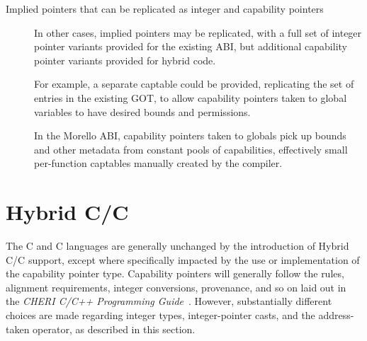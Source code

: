 \documentclass[12pt,twoside,openright,a4paper]{article}
\newcommand{\futurevariant}[1]{{\color{purple} #1}}
\newcommand{\morellovariant}[1]{{\color{red} #1}}
\newcommand{\note}[2]{{\color{blue}[ Note: #1 - #2]}}
\renewcommand{\note}[2]{\relax\ifhmode\unskip\fi}
\newcommand{\rwnote}[1]{\note{#1}{Robert W.}}
\newcommand{\psnote}[1]{\note{#1}{Peter S.}}
\newcommand*{\cpp}{\texorpdfstring{C\textsmaller[2]{\protect\nolinebreak[4]\hspace{-.05em}\raisebox{.45ex}{\textbf{++}}}}{C++}}
\newcommand*{\COrCpp}{C/\cpp{}}
\newcommand*{\hybridCOrCpp}{Hybrid \COrCpp{}}
\begin{document}
\begin{description}
  \rwnote{I'd been pondering whether the ABI might allow us to use a return
  capability, but in which unwind/etc only looked at the lower 64 bits...  And
  I suppose the builtin could be polymorphic.  But signals are indeed a messy
  issue.
  Is there a better example we could give?}

\item[Implied pointers that can be replicated as integer and capability
  pointers]
  In other cases, implied pointers may be replicated, with a full set of
  integer pointer variants provided for the existing ABI, but additional
  capability pointer variants provided for hybrid code.

  \futurevariant{For example, a separate captable could be provided,
  replicating the set of entries in the existing GOT, to allow capability
  pointers taken to global variables to have desired bounds and permissions.}

  \morellovariant{In the Morello ABI, capability pointers taken to globals
  pick up bounds and other metadata from constant pools of capabilities,
  effectively small per-function captables manually created by the compiler.}

  \psnote{really the first Morell-specific thing?}
  \psnote{the document has never (as far as I noticed) actually explained what a captable \emph{is}. probably that should have been much earlier}

\end{description}

\section{\hybridCOrCpp{}}

\psnote{wasn't the preceding section also all about \hybridCOrCpp{}?}

\psnote{somewhere this document should explain the (library or built-in) operations that one can do in hybrid on capabilities, what arithmetic one can do on them, what comparison does, etc., including concrete syntax (either general or by example)}

The C and \cpp{} languages are generally
unchanged
\psnote{``unperturbed'' has an unfortunate anthropomorphic misreading...}
by the introduction of
\hybridCOrCpp{} support, except where specifically impacted by the use or
implementation of the capability pointer type.
Capability pointers will generally follow the rules, alignment requirements,
integer conversions, provenance, and so on laid out in the \textit{CHERI C/C++
Programming Guide}~\cite{UCAM-CL-TR-947}.
However, substantially different choices are made regarding integer types,
integer-pointer casts, and the address-taken operator, as described in this section.
\end{document}
